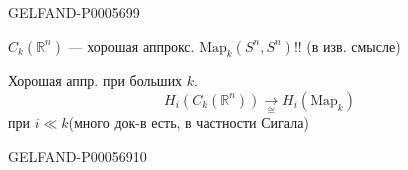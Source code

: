 \begin{GelfandAdjacentEvidence}{GELFAND-P000569}{9}

\(C_k(\mathbb R^n)\) — хорошая аппрокс. \(\mathrm{Map}_k(S^n,S^n)\)!! (в изв. смысле)

Хорошая аппр. при больших \(k\).
\[
H_i(C_k(\mathbb R^n))\underset{\cong}{\longrightarrow}H_i(\mathrm{Map}_k)
\]
\hfill при \(i\ll k\)\qquad (много док-в есть, в частности Сигала)\par
{}
\end{GelfandAdjacentEvidence}
\begin{GelfandAdjacentEvidence}{GELFAND-P000569}{10}

\end{GelfandAdjacentEvidence}



